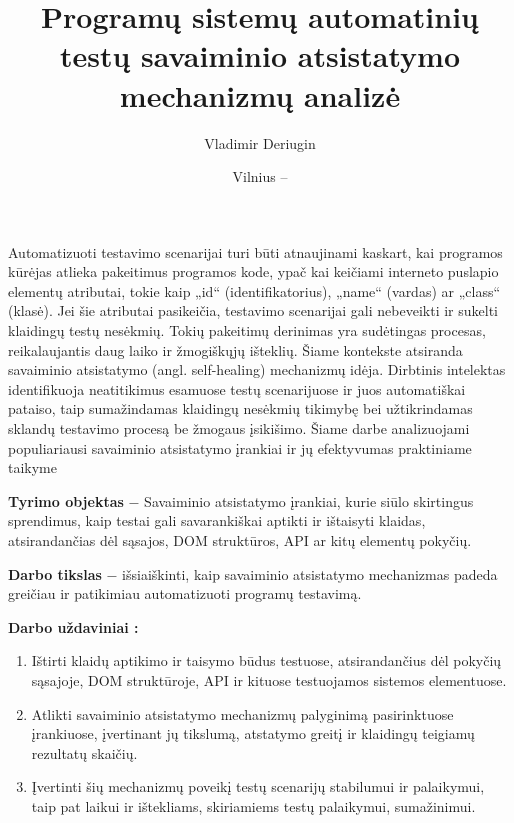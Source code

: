 \documentclass[
]{VUMIFPSkursinis}
\title{Programų sistemų automatinių testų savaiminio atsistatymo mechanizmų analizė}
\author{Vladimir Deriugin}
\date{Vilnius – \the\year}
\begin{document}
\maketitle

\tableofcontents



Automatizuoti testavimo scenarijai turi būti atnaujinami kaskart, kai programos kūrėjas atlieka pakeitimus programos kode, ypač kai keičiami interneto puslapio elementų atributai, tokie kaip „id“ (identifikatorius), „name“ (vardas) ar „class“ (klasė). Jei šie atributai pasikeičia, testavimo scenarijai gali nebeveikti ir sukelti klaidingų testų nesėkmių. Tokių pakeitimų derinimas yra sudėtingas procesas, reikalaujantis daug laiko ir žmogiškųjų išteklių. Šiame kontekste atsiranda savaiminio atsistatymo (angl. self-healing) mechanizmų idėja. Dirbtinis intelektas identifikuoja neatitikimus esamuose testų scenarijuose ir juos automatiškai pataiso, taip sumažindamas klaidingų nesėkmių tikimybę bei užtikrindamas sklandų testavimo procesą be žmogaus įsikišimo. Šiame darbe analizuojami populiariausi savaiminio atsistatymo įrankiai ir jų efektyvumas praktiniame taikyme

\textbf{Tyrimo objektas} $-$ Savaiminio atsistatymo įrankiai, kurie siūlo skirtingus sprendimus, kaip testai gali savarankiškai aptikti ir ištaisyti klaidas, atsirandančias dėl sąsajos, DOM struktūros, API ar kitų elementų pokyčių.

\textbf{Darbo tikslas} $-$  išsiaiškinti, kaip savaiminio atsistatymo mechanizmas padeda greičiau ir patikimiau automatizuoti programų testavimą.

\textbf{Darbo uždaviniai :} 
 
\begin{enumerate} 
    \item Ištirti klaidų aptikimo ir taisymo būdus testuose, atsirandančius dėl pokyčių sąsajoje, DOM struktūroje, API ir kituose testuojamos sistemos elementuose.
    \item Atlikti savaiminio atsistatymo mechanizmų palyginimą pasirinktuose įrankiuose, įvertinant jų tikslumą, atstatymo greitį ir klaidingų teigiamų rezultatų skaičių.
    \item Įvertinti šių mechanizmų poveikį testų scenarijų stabilumui ir palaikymui, taip pat laikui ir ištekliams, skiriamiems testų palaikymui, sumažinimui.
\end{enumerate}
\end{document}

